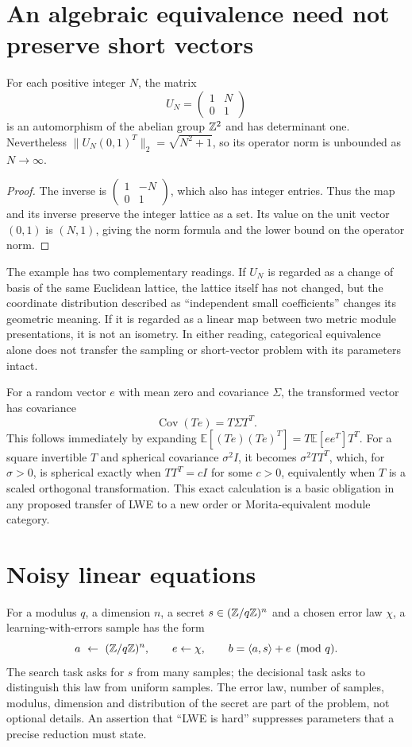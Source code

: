 \section{An algebraic equivalence need not preserve short vectors}
\begin{proposition}
For each positive integer $N$, the matrix
\[
 U_N=\begin{pmatrix}1&N\\0&1\end{pmatrix}
\]
is an automorphism of the abelian group $\mathbb{Z}^2$ and has determinant one. Nevertheless
$\|U_N(0,1)^T\|_2=\sqrt{N^2+1}$, so its operator norm is unbounded as $N\to\infty$.
\end{proposition}
\begin{proof}
The inverse is $\left(\begin{smallmatrix}1&-N\\0&1\end{smallmatrix}\right)$, which also has integer entries. Thus the map and its inverse preserve the integer lattice as a set. Its value on the unit vector $(0,1)$ is $(N,1)$, giving the norm formula and the lower bound on the operator norm.
\end{proof}

The example has two complementary readings. If $U_N$ is regarded as a change of basis of the same Euclidean lattice, the lattice itself has not changed, but the coordinate distribution described as ``independent small coefficients'' changes its geometric meaning. If it is regarded as a linear map between two metric module presentations, it is not an isometry. In either reading, categorical equivalence alone does not transfer the sampling or short-vector problem with its parameters intact.

For a random vector $e$ with mean zero and covariance $\Sigma$, the transformed vector has covariance
\[
 \operatorname{Cov}(Te)=T\Sigma T^T.
\]
This follows immediately by expanding
$\mathbb E[(Te)(Te)^T]=T\mathbb E[ee^T]T^T$.
For a square invertible $T$ and spherical covariance $\sigma^2I$, it becomes $\sigma^2TT^T$, which, for $\sigma>0$, is spherical exactly when $TT^T=cI$ for some $c>0$, equivalently when $T$ is a scaled orthogonal transformation. This exact calculation is a basic obligation in any proposed transfer of LWE to a new order or Morita-equivalent module category.

\section{Noisy linear equations}
For a modulus $q$, a dimension $n$, a secret $s\in(\mathbb{Z}/q\mathbb{Z})^n$ and a chosen error law $\chi$, a learning-with-errors sample has the form
\[
 a\ \leftarrow\ (\mathbb{Z}/q\mathbb{Z})^n,\qquad e\leftarrow\chi,\qquad
 b=\langle a,s\rangle+e\pmod q.
\]
The search task asks for $s$ from many samples; the decisional task asks to distinguish this law from uniform samples. The error law, number of samples, modulus, dimension and distribution of the secret are part of the problem, not optional details. An assertion that ``LWE is hard'' suppresses parameters that a precise reduction must state.

